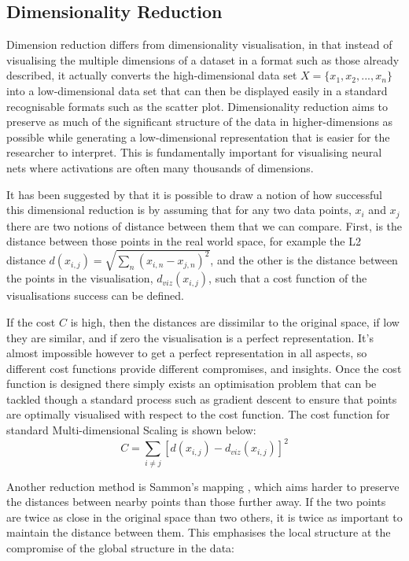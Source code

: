 \documentclass[a4paper,11pt,titlepage]{article}
\begin{document}
\subsection{Dimensionality Reduction}
	Dimension reduction differs from dimensionality visualisation, in that instead of visualising the multiple dimensions of a dataset in a format such as those already described, it actually converts the high-dimensional data set  $ X = \{ x_{1}, x_{2},..., x_{n} \} $ into a low-dimensional data set that can then be displayed easily in a standard recognisable formats such as the scatter plot. Dimensionality reduction aims to preserve as much of the significant structure of the data in higher-dimensions as possible while generating a low-dimensional representation that is easier for the researcher to interpret. This is fundamentally important for visualising neural nets where activations are often many thousands of dimensions.
		\par 
		It has been suggested by \cite{Olah2014b} that it is possible to draw a notion of how successful this dimensional reduction is by assuming that for any two data points, $ x_{i} $ and $ x_{j} $ there are two notions of distance between them that we can compare. First, is the distance between those points in the real world space, for example the L2 distance $ d(x_{i,j}) = \sqrt{\sum\nolimits_{n} (x_{i,n} - x_{j,n})^2 } $, and the other is the  distance between the points in the visualisation, $ d_{viz}(x_{i,j}) $, such that a cost function of the visualisations success can be defined.
		\par  		
		If the cost $ C $ is high, then the distances are dissimilar to the original space, if low they are similar, and if zero the visualisation is a perfect representation. It's almost impossible however to get a perfect representation in all aspects, so different cost functions provide different compromises, and insights. Once the cost function is designed there simply exists an optimisation problem that can be tackled though a standard process such as gradient descent to ensure that points are optimally visualised with respect to the cost function. The cost function for standard Multi-dimensional Scaling \cite{Torgerson1952} is shown below: 
		$$
			C = 
			\sum\limits_{i \neq j}
			[d(x_{i,j}) - d_{viz}(x_{i,j}) ]^2
		$$
		\par 
		Another reduction method is Sammon's mapping \cite{Sammon1969}, which aims harder to preserve the distances between nearby points than those further away. If the two points are twice as close in the original space than  two others, it is twice as important to maintain the distance between them. This emphasises the local structure at the compromise of the global structure in the data:
\end{document}
